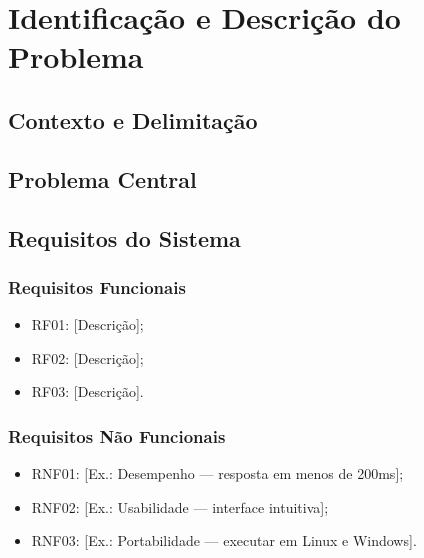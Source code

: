 \section{Identificação e Descrição do Problema}
\label{sec:problema}

\subsection{Contexto e Delimitação}

\subsection{Problema Central}

\subsection{Requisitos do Sistema}

\subsubsection{Requisitos Funcionais}
\begin{itemize}
  \item RF01: [Descrição];
  \item RF02: [Descrição];
  \item RF03: [Descrição].
\end{itemize}

\subsubsection{Requisitos Não Funcionais}
\begin{itemize}
  \item RNF01: [Ex.: Desempenho — resposta em menos de 200ms];
  \item RNF02: [Ex.: Usabilidade — interface intuitiva];
  \item RNF03: [Ex.: Portabilidade — executar em Linux e Windows].
\end{itemize}
